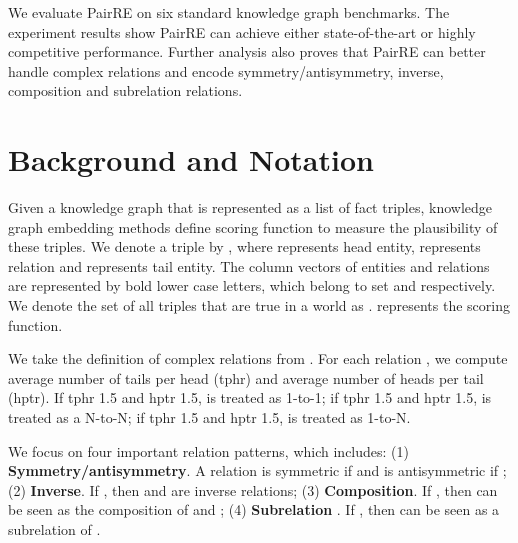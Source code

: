 \documentclass[11pt,a4paper]{article}
\begin{document}
We evaluate PairRE on six standard knowledge graph benchmarks. The experiment results show PairRE can achieve either state-of-the-art or highly competitive performance. Further analysis also proves that PairRE can better handle complex relations and encode symmetry/antisymmetry, inverse, composition and subrelation relations.


\section{Background and Notation}

Given a knowledge graph that is represented as a list of fact triples, knowledge graph embedding methods define scoring function to measure the plausibility of these triples.
We denote a triple by , where  represents head entity,  represents relation and  represents tail entity.
The column vectors of entities and relations are represented by bold lower case letters, which belong to set  and  respectively. We denote the set of all triples that are true in a world as .  represents the scoring function.

We take the definition of complex relations from \cite{wang2014knowledge}.
For each relation , we compute average number of tails per head (tphr) and average number of heads per tail (hptr). If tphr  1.5 and hptr  1.5,  is treated as 1-to-1; if tphr  1.5 and hptr  1.5,  is treated as a N-to-N; if tphr  1.5 and hptr  1.5,  is treated as 1-to-N.

We focus on four important relation patterns, which includes: (1) \textbf{Symmetry/antisymmetry}. A relation  is symmetric
if  and is antisymmetric
 if ; (2) \textbf{Inverse}. If , then 
and  are inverse relations; (3) \textbf{Composition}.
If ,
then  can be seen as the composition of  and ;
(4) \textbf{Subrelation} \cite{qu2019probabilistic}.
If ,
then  can be seen as a subrelation of .
\end{document}
